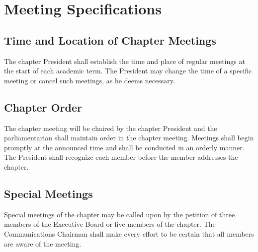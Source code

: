 \chapter{Meeting Specifications}
\label{cha:meeting-specifications}

\section{Time and Location of Chapter Meetings}
\label{sec:time-and-location-of-chapter-meetings}

The chapter President shall establish the time and place of regular meetings at
the start of each academic term.
The President may change the time of a specific
meeting or cancel such meetings, as he deems necessary.

\section{Chapter Order}
\label{sec:chapter-order}

The chapter meeting will be chaired by the chapter President and the
parliamentarian shall maintain order in the chapter meeting.
Meetings shall begin promptly at the announced time and shall be conducted in an
orderly manner.
The President shall recognize each member before the member addresses the
chapter.

\section{Special Meetings}
\label{sec:special-meetings-bylaws}

Special meetings of the chapter may be called upon by the petition of three
members of the Executive Board or five members of the chapter.
The Communications Chairman shall make every effort to be certain that all
members are aware of the meeting.

